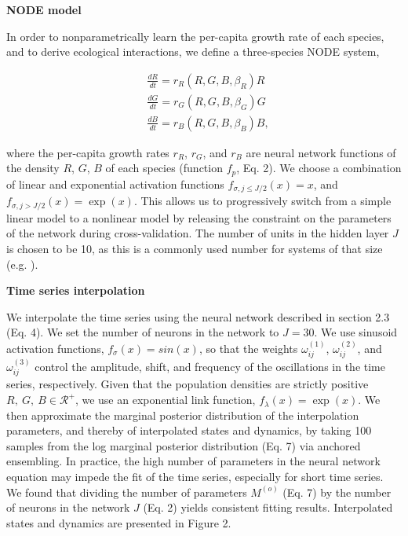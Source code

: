 \documentclass[11pt, oneside]{article}
\begin{document}
\textbf{NODE model}

In order to nonparametrically learn the per-capita growth rate of each species, and to derive ecological interactions, we define a three-species NODE system,

\vspace{-0.5cm}
\begin{equation} \begin{aligned}
	& \frac{dR}{dt} = r_R(R,G,B,\beta_R) R \\
	& \frac{dG}{dt} = r_G(R,G,B,\beta_G) G \\
	& \frac{dB}{dt} = r_B(R,G,B,\beta_B) B,
\end{aligned} \end{equation}

where the per-capita growth rates $r_R$, $r_G$, and $r_B$ are neural network functions of the density $R$, $G$, $B$ of each species (function $f_p$, Eq. 2).
We choose a combination of linear and exponential activation functions $f_{\sigma, j\leq J/2}(x) = x$, and $f_{\sigma, j>J/2}(x) = \exp(x)$.
This allows us to progressively switch from a simple linear model to a nonlinear model by releasing the constraint on the parameters of the network during cross-validation.
The number of units in the hidden layer $J$ is chosen to be 10, as this is a commonly used number for systems of that size (e.g. \cite{Wu2005,Bonnaffe2021a}). 

\textbf{Time series interpolation}

We interpolate the time series using the neural network described in section 2.3 (Eq. 4).
We set the number of neurons in the network to $J=30$.
We use sinusoid activation functions, $f_\sigma(x) = sin(x)$, so that the weights $\omega^{(1)}_{ij}$, $\omega^{(2)}_{ij}$, and $\omega^{(3)}_{ij}$ control the amplitude, shift, and frequency of the oscillations in the time series, respectively.
Given that the population densities are strictly positive $R,~G,~B \in \mathcal{R^{+}}$, we use an exponential link function, $f_\lambda(x) = \exp (x)$. 
We then approximate the marginal posterior distribution of the interpolation parameters, and thereby of interpolated states and dynamics, by taking 100 samples from the log marginal posterior distribution (Eq. 7) via anchored ensembling. 
In practice, the high number of parameters in the neural network equation may impede the fit of the time series, especially for short time series. 
We found that dividing the number of parameters $M^{(o)}$ (Eq. 7) by the number of neurons in the network $J$ (Eq. 2) yields consistent fitting results.
Interpolated states and dynamics are presented in Figure 2.
\end{document}
